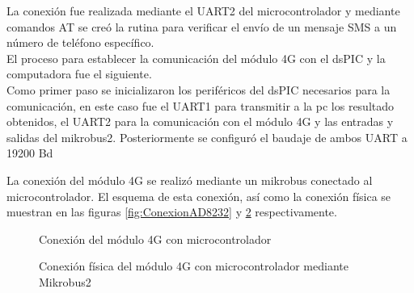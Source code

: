 La conexión fue realizada mediante el UART2 del microcontrolador y mediante comandos AT se creó la rutina para verificar el envío de un mensaje SMS a un número de teléfono específico.\\

El proceso para establecer la comunicación del módulo 4G con el dsPIC y la computadora fue el siguiente.\\

Como primer paso se inicializaron los periféricos del dsPIC necesarios para la comunicación, en este caso fue el UART1 para transmitir a la pc los resultado obtenidos, el UART2 para la comunicación con el módulo 4G y las entradas y salidas del mikrobus2. Posteriormente se configuró el baudaje de ambos UART a 19200 Bd





La conexión del módulo 4G se realizó mediante un mikrobus conectado al microcontrolador. El esquema de esta conexión, así como la conexión física se muestran en las figuras \ref{fig:ConexionAD8232} y \ref{fig:ConexionFisicaGSM} respectivamente.

	\begin{figure}[htbp!]
		\centering
		\caption{Conexión del módulo 4G con microcontrolador}
		\label{fig:ConexionGSM}
	\end{figure}
	
	\begin{figure}[htbp!]
		\centering
		\caption{Conexión física del módulo 4G con microcontrolador mediante Mikrobus2}
		\label{fig:ConexionFisicaGSM}
	\end{figure}
	
